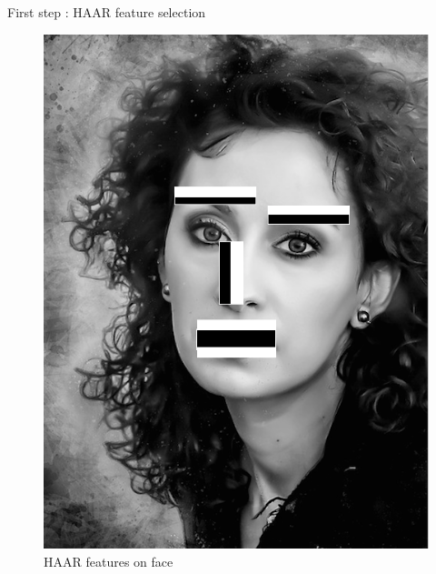 \documentclass[tikz,table,border=2mm]{beamer}
\begin{document}
\begin{frame}{First step : HAAR feature selection}
\begin{figure}[ht]
\begin{minipage}[b]{0.3\linewidth}
    \includegraphics[width=\textwidth]{images/haar_feature_2.png}
    \caption{HAAR features on face}
\end{minipage}
\end{figure}

\end{frame}
\end{document}
